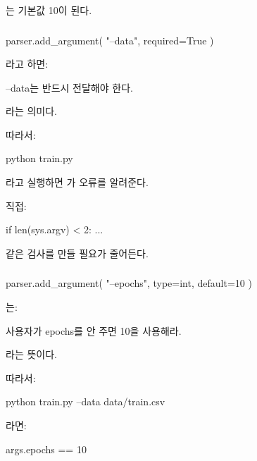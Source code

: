 는 기본값 10이 된다.

\subsubsection{}

\begin{dhkcode}
parser.add_argument(
    "--data",
    required=True
)
\end{dhkcode}

라고 하면:

\begin{dhksmry}[centered]
--data는 반드시 전달해야 한다.
\end{dhksmry}

라는 의미다.

따라서:

\begin{dhkzsh}
python train.py
\end{dhkzsh}

라고 실행하면 가 오류를 알려준다.

직접:

\begin{dhkcode}
if len(sys.argv) < 2:
...
\end{dhkcode}

같은 검사를 만들 필요가 줄어든다.

\subsubsection{}

\begin{dhkcode}
parser.add_argument(
    "--epochs",
    type=int,
    default=10
)
\end{dhkcode}

는:

\begin{dhksmry}[centered]
사용자가 epochs를 안 주면 10을 사용해라.
\end{dhksmry}

라는 뜻이다.

따라서:

\begin{dhkzsh}
python train.py --data data/train.csv
\end{dhkzsh}

라면:

\begin{dhkcode}
args.epochs == 10
\end{dhkcode}

